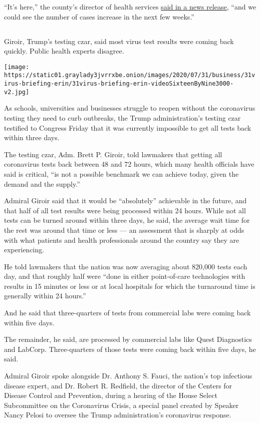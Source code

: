 ``It's here,'' the county's director of health services
\href{http://modochealthservices.org/corona-virus}{said in a news
release}, ``and we could see the number of cases increase in the next
few weeks.''

\hypertarget{-2}{%
\subsection{}\label{-2}}

Giroir, Trump's testing czar, said most virus test results were coming
back quickly. Public health experts disagree.

\texttt{[image: https://static01.graylady3jvrrxbe.onion/images/2020/07/31/business/31virus-briefing-erin/31virus-briefing-erin-videoSixteenByNine3000-v2.jpg]}

As schools, universities and businesses struggle to reopen without the
coronavirus testing they need to curb outbreaks, the Trump
administration's testing czar testified to Congress Friday that it was
currently impossible to get all tests back within three days.

The testing czar, Adm. Brett P. Giroir, told lawmakers that getting all
coronavirus tests back between 48 and 72 hours, which many health
officials have said is critical, ``is not a possible benchmark we can
achieve today, given the demand and the supply.''

Admiral Giroir said that it would be ``absolutely'' achievable in the
future, and that half of all test results were being processed within 24
hours. While not all tests can be turned around within three days, he
said, the average wait time for the rest was around that time or less
--- an assessment that is sharply at odds with what patients and health
professionals around the country say they are experiencing.

He told lawmakers that the nation was now averaging about 820,000 tests
each day, and that roughly half were ``done in either point-of-care
technologies with results in 15 minutes or less or at local hospitals
for which the turnaround time is generally within 24 hours.''

And he said that three-quarters of tests from commercial labs were
coming back within five days.

The remainder, he said, are processed by commercial labs like Quest
Diagnostics and LabCorp. Three-quarters of those tests were coming back
within five days, he said.

Admiral Giroir spoke alongside Dr. Anthony S. Fauci, the nation's top
infectious disease expert, and Dr. Robert R. Redfield, the director of
the Centers for Disease Control and Prevention, during a hearing of the
House Select Subcommittee on the Coronavirus Crisis, a special panel
created by Speaker Nancy Pelosi to oversee the Trump administration's
coronavirus response.

